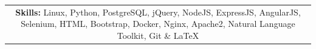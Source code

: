 \documentclass[letterpaper,11pt]{article}
\makeatletter
\newcommand{\resheading}[1]{{\Large {\textbf{#1 \vphantom{p\^{E}}}}}}
\newcommand{\ressubheading}[4]{
\begin{tabular*}{6.75in}{l@{\extracolsep{\fill}}r}
		\textbf{#1} & #2 \\
		\textit{#3} & \textit{#4} \\
\end{tabular*}\vspace{-6pt}}
\makeatother
\begin{document}

\setlength\tabcolsep{.15in}






\begin{table}[ht]
\begin{center}
\begin{tabular}
{ c  }
    \parbox[t]{4.5in}{%
	\textbf{\large Skills:} Linux, Python, PostgreSQL, jQuery, NodeJS, ExpressJS, AngularJS, Selenium, HTML, Bootstrap, Docker, Nginx, Apache2, Natural Language Toolkit, Git \& \LaTeX\\
    }%

%


\end{tabular}
\end{center}
\end{table}






\vspace{-1cm}








%


\end{document}
